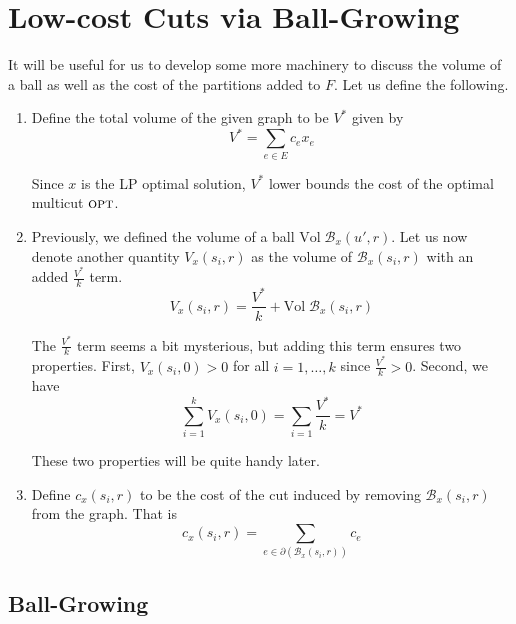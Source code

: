 \section{Low-cost Cuts via Ball-Growing}

It will be useful for us to develop some more machinery to discuss the volume of a ball as well as the cost of the partitions added to $F$. Let us define the following.
\vspace{-1em}
\begin{enumerate}[(1)]
\item Define the total volume of the given graph to be $V^*$ given by
\begin{equation*}
V^* = \sum_{e \in E} c_e x_e
\end{equation*}

Since $x$ is the LP optimal solution, $V^*$ lower bounds the cost of the optimal multicut $\textup{\textsc{opt}}$.

\item Previously, we defined the volume of a ball $\text{Vol} \; \mathcal{B}_x(u', r)$. Let us now denote another quantity $V_x(s_i, r)$ as the volume of $\mathcal{B}_x(s_i, r)$ with an added $\frac{V^*}{k}$ term.
\begin{equation*}
V_x(s_i, r) = \frac{V^*}{k} + \text{Vol} \; \mathcal{B}_x(s_i, r)
\end{equation*}

The $\frac{V^*}{k}$ term seems a bit mysterious, but adding this term ensures two properties. First, $V_x(s_i, 0) > 0$ for all $i = 1, \ldots, k$ since $\frac{V^*}{k} > 0$. Second, we have
\begin{equation*}
\sum_{i=1}^k V_x(s_i, 0)
= \sum_{i=1} \frac{V^*}{k}
= V^*
\end{equation*}

These two properties will be quite handy later.

\item Define $c_x(s_i, r)$ to be the cost of the cut induced by removing $\mathcal{B}_x(s_i, r)$ from the graph. That is
\begin{equation*}
c_x(s_i, r) = \sum_{e \in \partial(\mathcal{B}_x(s_i, r))} c_e
\end{equation*}
\end{enumerate}


\subsection{Ball-Growing}

